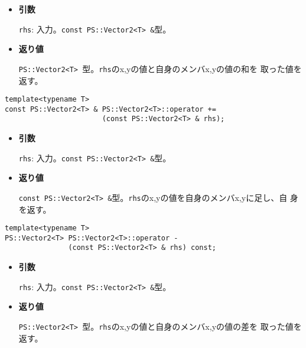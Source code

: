 \begin{itemize}

\item{{\bf 引数}}

{\tt rhs}: 入力。{\tt const PS::Vector2<T> \&}型。

\item{{\bf 返り値}}

{\tt PS::Vector2<T> }型。{\tt rhs}のx,yの値と自身のメンバx,yの値の和を
取った値を返す。

\end{itemize}


\begin{screen}
\begin{verbatim}
template<typename T>
const PS::Vector2<T> & PS::Vector2<T>::operator += 
                       (const PS::Vector2<T> & rhs);
\end{verbatim}
\end{screen}

\begin{itemize}

\item{{\bf 引数}}

{\tt rhs}: 入力。{\tt const PS::Vector2<T> \&}型。

\item{{\bf 返り値}}

{\tt const PS::Vector2<T> \&}型。{\tt rhs}のx,yの値を自身のメンバx,yに足し、自
身を返す。

\end{itemize}


\begin{screen}
\begin{verbatim}
template<typename T>
PS::Vector2<T> PS::Vector2<T>::operator - 
               (const PS::Vector2<T> & rhs) const;
\end{verbatim}
\end{screen}

\begin{itemize}

\item{{\bf 引数}}

{\tt rhs}: 入力。{\tt const PS::Vector2<T> \&}型。

\item{{\bf 返り値}}

{\tt PS::Vector2<T> }型。{\tt rhs}のx,yの値と自身のメンバx,yの値の差を
取った値を返す。

\end{itemize}


